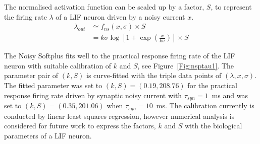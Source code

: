 	The normalised activation function can be scaled up by a factor, $S$, to represent the firing rate $\lambda$ of a LIF neuron driven by a noisy current $x$.
	\begin{equation}
	\begin{aligned}
	\lambda_{out} &\simeq f_{ns}(x, \sigma) \times S\\
	&=k \sigma \log [1 + \exp(\frac{x}{k \sigma})] \times S
	\end{aligned}
	\label{equ:fit}
	\end{equation}	
	
	The Noisy Softplus fits well to the practical response firing rate of the LIF neuron with suitable calibration of $k$ and $S$, see Figure~\ref{Fig:nsptau1}.
	The parameter pair of $(k, S)$ is curve-fitted with the triple data points of $(\lambda, x, \sigma)$.
	The fitted parameter was set to $(k, S)=(0.19,208.76)$ for the practical response firing rate driven by synaptic noisy current with $\tau_{syn}=1$~ms and was set to $(k, S)=(0.35,201.06)$ when $\tau_{syn}=10$~ms.
	The calibration currently is conducted by linear least squares regression, however numerical analysis is considered for future work to express the factors, $k$ and $S$ with the biological parameters of a LIF neuron.
	
